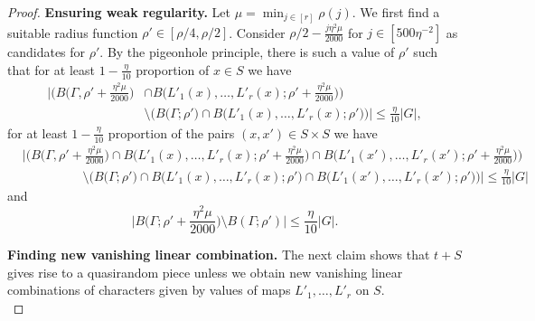 \documentclass[a4paper,11pt]{article}
\numberwithin{theorem}{section}
\theoremstyle{definition}
\begin{document}
\begin{proof}
\noindent\textbf{Ensuring weak regularity.} Let $\mu = \min_{j \in [r]} \rho(j)$. We first find a suitable radius function $\rho' \in [\rho/4, \rho/2]$. Consider $\rho/2 - \frac{j \eta^2 \mu}{2000}$ for $j \in [500 \eta^{-2}]$ as candidates for $\rho'$. By the pigeonhole principle, there is such a value of $\rho'$ such that for at least $1 - \frac{\eta}{10}$ proportion of $x \in S$ we have
\begin{align}\Big|\Big(B\Big(\Gamma, \rho' + \frac{\eta^2 \mu}{2000}\Big) &\cap B\Big(L'_1(x), \dots, L'_r(x); \rho'+ \frac{\eta^2 \mu}{2000}\Big)\Big)\nonumber\\
&\setminus \Big(B\Big(\Gamma; \rho'\Big) 
\cap B\Big(L'_1(x), \dots, L'_r(x); \rho'\Big)\Big)\Big| \leq \frac{\eta}{10} |G|,\label{wreg1piece}\end{align}
for at least $1-\frac{\eta}{10}$ proportion of the pairs $(x,x') \in S \times S$ we have 
\begin{align}&\Big|\Big(B\Big(\Gamma, \rho' + \frac{\eta^2 \mu}{2000}\Big) \cap B\Big(L'_1(x), \dots, L'_r(x); \rho'+ \frac{\eta^2 \mu}{2000}\Big)\cap B\Big(L'_1(x'), \dots, L'_r(x'); \rho'+ \frac{\eta^2 \mu}{2000}\Big)\Big)\nonumber\\
&\hspace{2cm}\setminus \Big(B\Big(\Gamma; \rho'\Big) \cap B\Big(L'_1(x), \dots, L'_r(x); \rho'\Big)\cap B\Big(L'_1(x'), \dots, L'_r(x'); \rho'\Big)\Big)\Big| \leq \frac{\eta}{10} |G|\label{wreg2piece}\end{align}  
and 
\begin{equation}\Big|B\Big(\Gamma; \rho' + \frac{\eta^2 \mu}{2000}\Big) \setminus B(\Gamma; \rho')\Big| \leq \frac{\eta}{10} |G|.\label{wreg3piece}\end{equation}

\phantom{a}\hspace{\baselineskip}

\noindent\textbf{Finding new vanishing linear combination.} The next claim shows that $t + S$ gives rise to a quasirandom piece unless we obtain new vanishing linear combinations of characters given by values of maps $L'_1, \dots, L'_r$ on $S$.\\


\end{proof}
\end{document}
